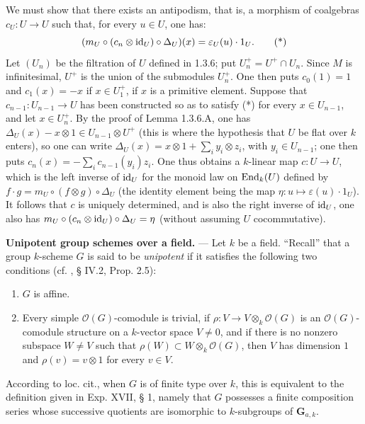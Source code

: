 We must show that there exists an antipodism, that is, a morphism of coalgebras $c_U:U\to U$ such that, for every $u\in U$, one has:
\[
(m_U\circ(c_n\otimes\mathrm{id}_U)\circ\Delta_U)(x)=\varepsilon_U(u)\cdot1_U.\tag{*}
\]
Let $(U_n)$ be the filtration of $U$ defined in 1.3.6; put $U_n^+=U^+\cap U_n$. Since $M$ is infinitesimal, $U^+$ is the union of the submodules $U_n^+$. One then puts $c_0(1)=1$ and $c_1(x)=-x$ if $x\in U_1^+$, \ie if $x$ is a primitive element. Suppose that $c_{n-1}:U_{n-1}\to U$ has been constructed so as to satisfy (*) for every $x\in U_{n-1}$, and let $x\in U_n^+$. By the proof of Lemma 1.3.6.A, one has $\Delta_U(x)-x\otimes1\in U_{n-1}\otimes U^+$ (this is where the hypothesis that $U$ be flat over $k$ enters), so one can write $\Delta_U(x)=x\otimes1+\sum_i y_i\otimes z_i$, with $y_i\in U_{n-1}$; one then puts $c_n(x)=-\sum_i c_{n-1}(y_i)z_i$. One thus obtains a $k$-linear map $c:U\to U$, which is the left inverse of $\mathrm{id}_U$ for the monoid law on $\operatorname{End}_k(U)$ defined by $f\cdot g=m_U\circ(f\otimes g)\circ\Delta_U$ (the identity element being the map $\eta:u\mapsto\varepsilon(u)\cdot1_U$). It follows that $c$ is uniquely determined, and is also the right inverse of $\mathrm{id}_U$, \ie one also has $m_U\circ(c_n\otimes\mathrm{id}_U)\circ\Delta_U=\eta$ (without assuming $U$ cocommutative).

\textbf{Unipotent group schemes over a field.} --- Let $k$ be a field. ``Recall'' that a group $k$-scheme $G$ is said to be \emph{unipotent} if it satisfies the following two conditions (cf. \cite{DG70}, § IV.2, Prop. 2.5):
\begin{enumerate}
\item[(a)] $G$ is affine.
\item[(b)] Every simple $\mathcal O(G)$-comodule is trivial, \ie if $\rho:V\to V\otimes_k\mathcal O(G)$ is an $\mathcal O(G)$-comodule structure on a $k$-vector space $V\ne0$, and if there is no nonzero subspace $W\ne V$ such that $\rho(W)\subset W\otimes_k\mathcal O(G)$, then $V$ has dimension $1$ and $\rho(v)=v\otimes1$ for every $v\in V$.
\end{enumerate}
According to loc. cit., when $G$ is of finite type over $k$, this is equivalent to the definition given in Exp. XVII, § 1, namely that $G$ possesses a finite composition series whose successive quotients are isomorphic to $k$-subgroups of $\mathbf G_{a,k}$.

